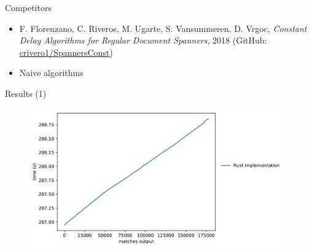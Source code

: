 \documentclass{beamer}
\begin{document}
  \begin{frame}{Competitors}
    \begin{itemize}
      \item  F. Florenzano, C. Riveros, M. Ugarte, S. Vansummeren, D. Vrgoc,
        \emph{Constant Delay Algorithms for Regular Document Spanners}, 2018
        (GitHub:
        \href{https://github.com/crivero1/SpannersConst}{crivero1/SpannersConst})
      \item Naive algorithms
    \end{itemize}

    \vfill

  \end{frame}

  \begin{frame}{Results (1)}
    \begin{figure}%
      \includegraphics[trim={0 0 0 1.2cm}, clip, width=11cm]{figures/bench_enum_only}
    \end{figure}
  \end{frame}
\end{document}
